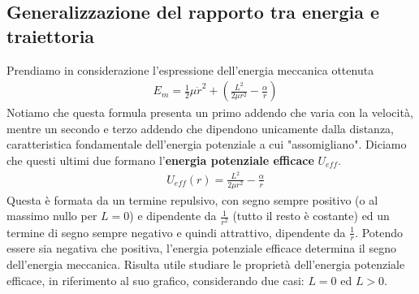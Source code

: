 \documentclass[10pt,a4paper]{article}
\begin{document}
\subsection{Generalizzazione del rapporto tra energia e traiettoria}
Prendiamo in considerazione l'espressione dell'energia meccanica ottenuta
\begin{align*}
	&E_m= \frac{1}{2}\mu \dot{r}^2+ (\frac{L^2}{2\mu r^2} -\frac{\alpha}{r})
\end{align*}
Notiamo che questa formula presenta un primo addendo che varia con la velocità, mentre un secondo e terzo addendo che dipendono unicamente dalla distanza, caratteristica fondamentale dell'energia potenziale a cui "assomigliano". Diciamo che questi ultimi due formano l'\textbf{energia potenziale efficace} $U_{eff}$.
\begin{align*}
&U_{eff}(r) = \frac{L^2}{2\mu r^2} -\frac{\alpha}{r}
\end{align*}
Questa è formata da un termine repulsivo, con segno sempre positivo (o al massimo nullo per $L=0$) e dipendente da $\frac{1}{r^2}$ (tutto il resto è costante) ed un termine di segno sempre negativo e quindi attrattivo, dipendente da $\frac{1}{r}$. Potendo essere sia negativa che positiva, l'energia potenziale efficace determina il segno dell'energia meccanica.  Risulta utile studiare le proprietà dell'energia potenziale efficace, in riferimento al suo grafico, considerando due casi: $L=0$ ed $L>0$.
\newpage
\end{document}
